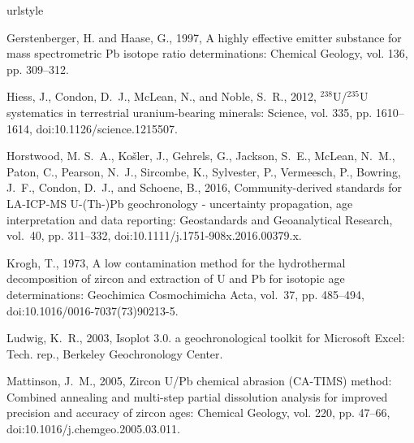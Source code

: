 \documentclass[11pt,letterpaper]{article}
\begin{document}




\clearpage
\pagebreak
\singlespacing

\small
\begin{thebibliography}{11}
\providecommand{\natexlab}[1]{#1}
\providecommand{\url}[1]{\texttt{#1}}
\providecommand{\urlprefix}{URL }
\expandafter\ifx\csname urlstyle\endcsname\relax
  \providecommand{\doi}[1]{doi:\discretionary{}{}{}#1}\else
  \providecommand{\doi}{doi:\discretionary{}{}{}\begingroup
  \urlstyle{rm}\Url}\fi

Gerstenberger, H. and Haase, G., 1997, A highly effective emitter substance for
  mass spectrometric {P}b isotope ratio determinations: Chemical Geology, vol.
  136, pp. 309--312.

Hiess, J., Condon, D.~J., McLean, N., and Noble, S.~R., 2012,
  $^{238}${U}/$^{235}${U} systematics in terrestrial uranium-bearing minerals:
  Science, vol. 335, pp. 1610--1614, \doi{10.1126/science.1215507}.

Horstwood, M. S.~A., Ko{\v{s}}ler, J., Gehrels, G., Jackson, S.~E., McLean,
  N.~M., Paton, C., Pearson, N.~J., Sircombe, K., Sylvester, P., Vermeesch, P.,
  Bowring, J.~F., Condon, D.~J., and Schoene, B., 2016, Community-derived
  standards for {LA}-{ICP}-{MS} {U}-({T}h-){P}b geochronology - uncertainty
  propagation, age interpretation and data reporting: Geostandards and
  Geoanalytical Research, vol.~40, pp. 311--332,
  \doi{10.1111/j.1751-908x.2016.00379.x}.

Krogh, T., 1973, A low contamination method for the hydrothermal decomposition
  of zircon and extraction of {U} and {P}b for isotopic age determinations:
  Geochimica Cosmochimicha Acta, vol.~37, pp. 485--494,
  \doi{10.1016/0016-7037(73)90213-5}.

Ludwig, K.~R., 2003, Isoplot 3.0. a geochronological toolkit for {M}icrosoft
  {E}xcel: Tech. rep., Berkeley Geochronology Center.

Mattinson, J.~M., 2005, {Zircon U/Pb chemical abrasion (CA-TIMS) method:
  Combined annealing and multi-step partial dissolution analysis for improved
  precision and accuracy of zircon ages}: Chemical Geology, vol. 220, pp.
  47--66, \doi{10.1016/j.chemgeo.2005.03.011}.


\end{thebibliography}
\end{document}
